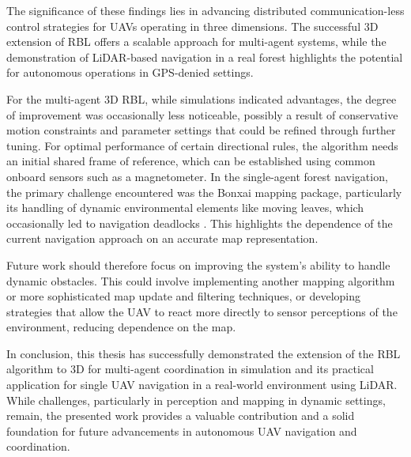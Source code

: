 The significance of these findings lies in advancing distributed communication-less control strategies for \ac{UAV}s operating in three dimensions. 
The successful 3D extension of \ac{RBL} offers a scalable approach for multi-agent systems, while the demonstration of \ac{LiDAR}-based navigation in a real forest highlights the potential for autonomous operations in GPS-denied settings. 

For the multi-agent 3D \ac{RBL}, while simulations indicated advantages, the degree of improvement was occasionally less noticeable, possibly a result of conservative motion constraints and parameter settings that could be refined through further tuning.
For optimal performance of certain directional rules, the algorithm needs an initial shared frame of reference, which can be established using common onboard sensors such as a magnetometer.
In the single-agent forest navigation, the primary challenge encountered was the Bonxai mapping package, particularly its handling of dynamic environmental elements like moving leaves, which occasionally led to navigation deadlocks \cite{flight_fail}. 
This highlights the dependence of the current navigation approach on an accurate map representation.

Future work should therefore focus on improving the system's ability to handle dynamic obstacles. 
This could involve implementing another mapping algorithm or more sophisticated map update and filtering techniques, or developing strategies that allow the UAV to react more directly to sensor perceptions of the environment, reducing dependence on the map.

In conclusion, this thesis has successfully demonstrated the extension of the \ac{RBL} algorithm to 3D for multi-agent coordination in simulation and its practical application for single \ac{UAV} navigation in a real-world environment using \ac{LiDAR}. 
While challenges, particularly in perception and mapping in dynamic settings, remain, the presented work provides a valuable contribution and a solid foundation for future advancements in autonomous \ac{UAV} navigation and coordination.
